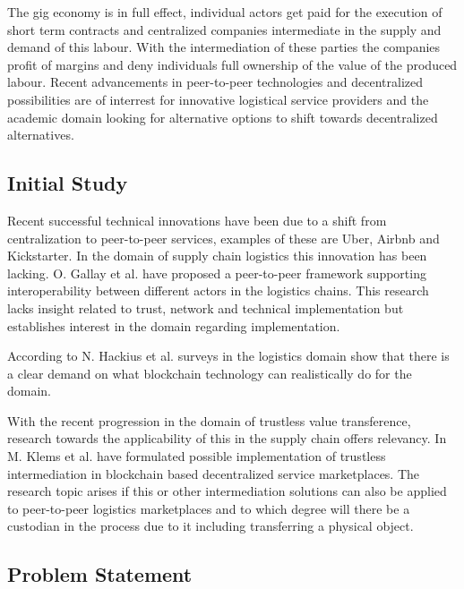The gig economy is in full effect, individual actors get paid for the execution of short term contracts and centralized companies intermediate in the supply and demand of this labour. With the intermediation of these parties the companies profit of margins and deny individuals full ownership of the value of the produced labour. Recent advancements in peer-to-peer technologies and decentralized possibilities are of interrest for innovative logistical service providers and the academic domain looking for alternative options to shift towards decentralized alternatives.\par

\subsection{Initial Study}

Recent successful technical innovations have been due to a shift from centralization to peer-to-peer services, examples of these are Uber, Airbnb and Kickstarter. In the domain of supply chain logistics this innovation has been lacking. O. Gallay et al. \cite{peer-to-peerDecentralizedLogistics} have proposed a peer-to-peer framework supporting interoperability between different actors in the logistics chains. This research lacks insight related to trust, network and technical implementation but establishes interest in the domain regarding implementation. \par
According to N. Hackius et al. \cite{hackius2017blockchain} surveys in the logistics domain show that there is a clear demand on what blockchain technology can realistically do for the domain. \par
With the recent progression in the domain of trustless value transference, research towards the applicability of this in the supply chain offers relevancy. In \cite{trustlessIntermediationInBCServiceMarket} M. Klems et al. have formulated possible implementation of trustless intermediation in blockchain based decentralized service marketplaces. The research topic arises if this or other intermediation solutions can also be applied to peer-to-peer logistics marketplaces and to which degree will there be a custodian in the process due to it including transferring a physical object.

\subsection{Problem Statement}

